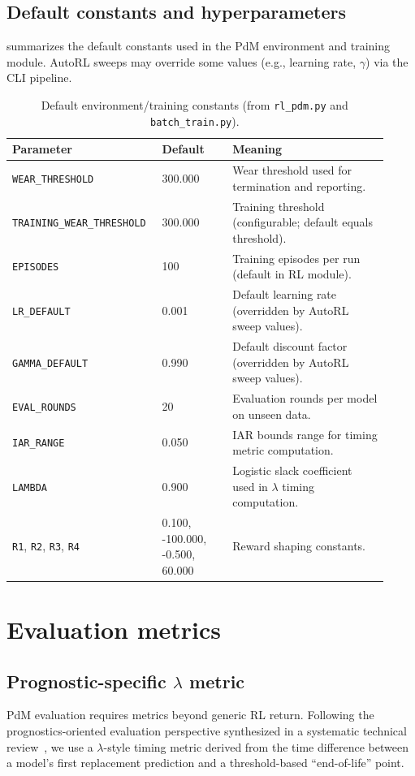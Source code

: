 \documentclass[11pt]{article}
\begin{document}
\subsection{Default constants and hyperparameters}
\label{sec:defaults}
 summarizes the default constants used in the PdM environment and training module. AutoRL sweeps may override some values (e.g., learning rate, $\gamma$) via the CLI pipeline.

\begin{table}[t]
\centering
\caption{Default environment/training constants (from \texttt{rl\_pdm.py} and \texttt{batch\_train.py}).}
\label{tab:defaults}
\begin{tabular}{p{0.34\linewidth} p{0.18\linewidth} p{0.40\linewidth}}
\toprule
\rowcolor{gray!20} \textbf{Parameter} & \textbf{Default} & \textbf{Meaning}\\
\midrule
\texttt{WEAR\_THRESHOLD} & 300.000 & Wear threshold used for termination and reporting.\\
\texttt{TRAINING\_WEAR\_THRESHOLD} & 300.000 & Training threshold (configurable; default equals threshold).\\
\texttt{EPISODES} & 100 & Training episodes per run (default in RL module).\\
\texttt{LR\_DEFAULT} & 0.001 & Default learning rate (overridden by AutoRL sweep values).\\
\texttt{GAMMA\_DEFAULT} & 0.990 & Default discount factor (overridden by AutoRL sweep values).\\
\texttt{EVAL\_ROUNDS} & 20 & Evaluation rounds per model on unseen data.\\
\texttt{IAR\_RANGE} & 0.050 & IAR bounds range for timing metric computation.\\
\texttt{LAMBDA} & 0.900 & Logistic slack coefficient used in $\lambda$ timing computation.\\
\texttt{R1}, \texttt{R2}, \texttt{R3}, \texttt{R4} & 0.100, -100.000, -0.500, 60.000 & Reward shaping constants.\\
\bottomrule
\end{tabular}
\end{table}

\section{Evaluation metrics}
\subsection{Prognostic-specific $\lambda$ metric}
PdM evaluation requires metrics beyond generic RL return. Following the prognostics-oriented evaluation perspective synthesized in a systematic technical review~\cite{RLforPdMReview2023}, we use a $\lambda$-style timing metric derived from the time difference between a model's first replacement prediction and a threshold-based ``end-of-life'' point.
\end{document}
